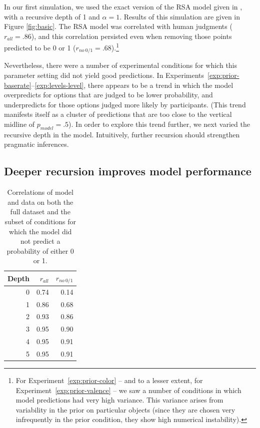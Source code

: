 \documentclass[man]{apa6}
\newcounter{Experiment}
\newcommand{\exptref}[1]{Experiment~\ref{#1}}
\newcommand{\exptrefrange}[2]{Experiments~\ref{#1}--\ref{#2}}
\begin{document}
In our first simulation, we used the exact version of the RSA model given in , with a recursive depth of 1 and $\alpha=1$. Results of this simulation are given in Figure \ref{fig:basic}. The RSA model was correlated with human judgments ($r_{all} = .86$), and this correlation persisted even when removing those points predicted to be 0 or 1 ($r_{no~0/1} = .68$).\footnote{For \exptref{exp:prior-color} -- and to a lesser extent, for \exptref{exp:prior-valence} -- we saw a number of conditions in which model predictions had very high variance. This variance arises from variability in the prior on particular objects (since they are chosen very infrequently in the prior condition, they show high numerical instability).}

Nevertheless, there were a number of experimental conditions for which this parameter setting did not yield good predictions. In \exptrefrange{exp:prior-baserate}{exp:levels-level}, there appears to be a trend in which the model overpredicts for options that are judged to be lower probability, and underpredicts for those options judged more likely by participants. (This trend manifests itself as a cluster of predictions that are too close to the vertical midline of $p_{model}=.5$). In order to explore this trend further, we next varied the recursive depth in the model. Intuitively, further recursion should strengthen pragmatic inferences.

\subsection{Deeper recursion improves model performance}

\begin{table}[ht]
\centering
\begin{tabular}{rrr}
  \hline
Depth & $r_{all}$ & $r_{no~0/1}$ \\
  \hline
  0 & 0.74 & 0.14 \\
    1 & 0.86 & 0.68 \\
    2 & 0.93 & 0.86 \\
    3 & 0.95 & 0.90 \\
    4 & 0.95 & 0.91 \\
    5 & 0.95 & 0.91 \\
   \hline
\end{tabular}
\caption{\label{tab:corr-a1} Correlations of model and data on both the full dataset and the subset of conditions for which the model did not predict a probability of either 0 or 1.}
\end{table}
\end{document}
